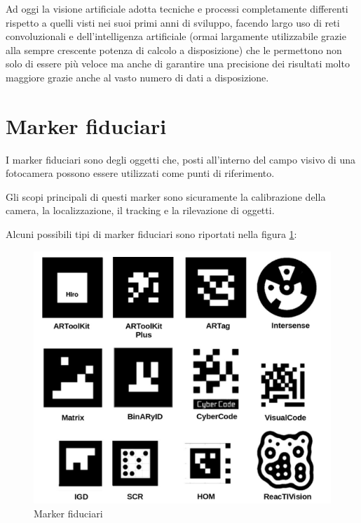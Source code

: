 \documentclass[12pt,a4paper,openright,twoside]{book}
\begin{document}
Ad oggi la visione artificiale adotta tecniche e processi completamente differenti rispetto a quelli visti nei suoi primi anni di sviluppo, facendo largo uso di reti convoluzionali e dell'intelligenza artificiale (ormai largamente utilizzabile grazie alla sempre crescente potenza di calcolo a disposizione) che le permettono non solo di essere più veloce ma anche di garantire una precisione dei risultati molto maggiore grazie anche al vasto numero di dati a disposizione.

\section{Marker fiduciari} \label{sec:marker_fiduciari}
I marker fiduciari sono degli oggetti che, posti all'interno del campo visivo di una fotocamera possono essere utilizzati come punti di riferimento. 

Gli scopi principali di questi marker sono sicuramente la calibrazione della camera, la localizzazione, il tracking e la rilevazione di oggetti.

Alcuni possibili tipi di marker fiduciari sono riportati nella figura \ref{fig:marker_fiduciari}:

\begin{figure}
	\centering
	\includegraphics[width=0.8\linewidth]{./figures/fiducialMarkers.png}
	\caption{Marker fiduciari\cite{GARRIDOJURADO20142280}}
	\label{fig:marker_fiduciari}
\end{figure}
\end{document}
